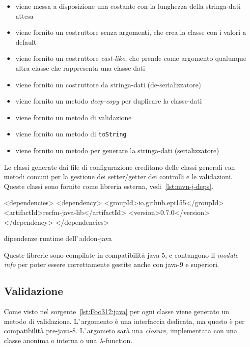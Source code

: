 \documentclass[a4paper,10pt]{report}
\newenvironment{elisting}[1][H]
  {\captionsetup{aboveskip=0pt}\begin{listing}[#1]}
  {\end{listing}%
}
\begin{document}
\begin{itemize}
\item viene messa a disposizione una costante con la lunghezza della 
    stringa-dati attesa
\item viene fornito un costruttore senza argomenti, che crea la classe con i 
    valori a default
\item viene fornito un costruttore \textit{cast-like}, che prende come argomento
    qualunque altra classe che rappresenta una classe-dati
\item viene fornito un costruttore da stringa-dati (de-serializzatore)
\item viene fornito un metodo \textit{deep-copy} per duplicare la classe-dati
\item viene fornito un metodo di validazione
\item viene fornito un metodo di \texttt{toString}
\item viene fornito un metodo per generare la stringa-dati (serializzatore)
\end{itemize}

Le classi generate dai file di configurazione ereditano delle classi generali
con metodi comuni per la gestione dei setter/getter dei controlli e le 
validazioni. Queste classi sono fornite come libreria esterna, 
vedi~\ref{lst:mvn-j-deps}.

\begin{elisting}[!htb]
\begin{xmlcode}
<dependencies>
  <dependency>
    <groupId>io.github.epi155</groupId>
    <artifactId>recfm-java-lib</artifactId>
    <version>0.7.0</version>
  </dependency>
</dependencies>
\end{xmlcode}
\caption{dipendenze runtime dell'\,addon-java}
\label{lst:mvn-j-deps}
\end{elisting}

Queste librerie sono compilate in compatibilità java-5, e contangono il
\textsl{module-info} per poter essere correttamente gestite anche con java-9 e
superiori.

\subsection{Validazione}
Come visto nel sorgente~\ref{lst:Foo312:java} per ogni classe viene generato
un metodo di validazione. L'\,argomento è una interfaccia dedicata, ma questo è
per compatibilità pre-java-8.
L'\,argometo sarà una \textit{closure}, implementata con una classe anonima o 
interna o una $\lambda$-function.
\end{document}

